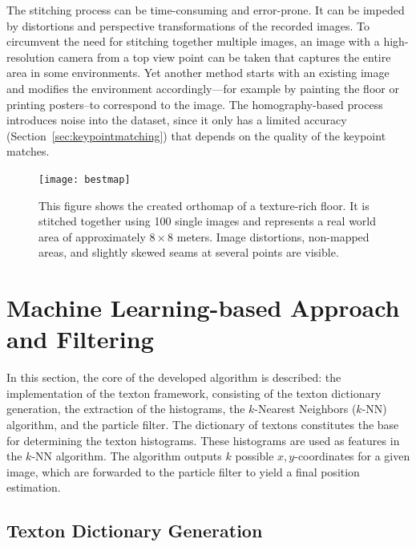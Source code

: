 \documentclass[11pt]{report}
\begin{document}
The stitching process can be time-consuming and error-prone. It can be
impeded by distortions and perspective transformations of the recorded
images. To circumvent the need for stitching together multiple images,
an image with a high-resolution camera from a top view point can be
taken that captures the entire area in some environments. Yet another
method starts with an existing image and modifies the environment
accordingly---for example by painting the floor or printing
posters--to correspond to the image.
The homography-based process introduces noise into the dataset, since
it only has a limited accuracy (Section~\ref{sec:keypointmatching})
that depends on the quality of the keypoint matches.
\begin{figure}[h!]
\begin{center}
\texttt{[image: bestmap]}
\caption{{\label{fig:orthomap} This figure shows the created orthomap
    of a texture-rich floor. It is stitched together using 100 single
    images and represents a real world area of approximately
    $8\times8$ meters. Image distortions, non-mapped areas, and
    slightly skewed seams at several points are visible.%
  }}
\end{center}
\end{figure}


\section{Machine Learning-based Approach and Filtering}
\label{sec:textons}

In this section, the core of the developed algorithm is described: the
implementation of the texton framework, consisting of the texton
dictionary generation, the extraction of the histograms, the
$k$-Nearest Neighbors ($k$-NN) algorithm, and the particle filter. The
dictionary of textons constitutes the base for determining the texton
histograms. These histograms are used as features in the $k$-NN
algorithm. The algorithm outputs $k$ possible $x,y$-coordinates for a
given image, which are forwarded to the particle filter to yield a
final position estimation.

\subsection{Texton Dictionary Generation}
\label{sec:text-dict-gener}
\end{document}
